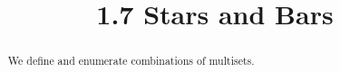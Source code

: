 \documentclass[handout]{ximera}
\title{1.7 Stars and Bars}
\begin{document}
\begin{abstract}
We define and enumerate combinations of multisets.
\end{abstract}

\maketitle
\end{document}
